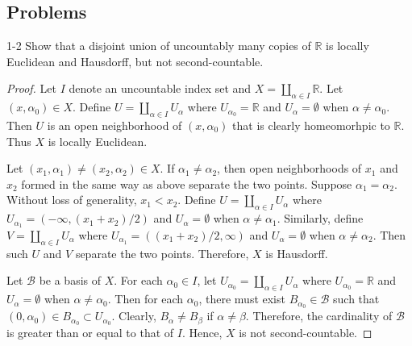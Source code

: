 \subsection{Problems}

\begin{customprob}{1-2}
  Show that a disjoint union of uncountably many copies of $\mathbb{R}$ is locally Euclidean and Hausdorff, but not second-countable.
\end{customprob}

\begin{proof}
  Let $I$ denote an uncountable index set and $X = \coprod_{\alpha \in I} \mathbb{R}$.
  Let $(x, \alpha_0) \in X$.
  Define $U = \coprod_{\alpha \in I} U_{\alpha}$ where $U_{\alpha_0} = \mathbb{R}$ and $U_{\alpha} = \emptyset$ when $\alpha \ne \alpha_0$.
  Then $U$ is an open neighborhood of $(x, \alpha_0)$ that is clearly homeomorhpic to $\mathbb{R}$.
  Thus $X$ is locally Euclidean.

  Let $(x_1, \alpha_1) \ne (x_2, \alpha_2) \in X$.
  If $\alpha_1 \ne \alpha_2$, then open neighborhoods of $x_1$ and $x_2$ formed in the same way as above separate the two points.
  Suppose $\alpha_1 = \alpha_2$.
  Without loss of generality, $x_1 < x_2$.
  Define $U = \coprod_{\alpha \in I} U_{\alpha}$ where $U_{\alpha_1} = (-\infty, (x_1 + x_2) / 2)$ and $U_{\alpha} = \emptyset$ when $\alpha \ne \alpha_1$.
  Similarly, define $V = \coprod_{\alpha \in I} U_{\alpha}$ where $U_{\alpha_1} = ((x_1 + x_2) / 2, \infty)$ and $U_{\alpha} = \emptyset$ when $\alpha \ne \alpha_2$.
  Then such $U$ and $V$ separate the two points.
  Therefore, $X$ is Hausdorff.

  Let $\mathcal{B}$ be a basis of $X$.
  For each $\alpha_0 \in I$, let $U_{\alpha_0} = \coprod_{\alpha \in I} U_{\alpha}$ where $U_{\alpha_0} = \mathbb{R}$ and $U_{\alpha} = \emptyset$ when $\alpha \ne \alpha_0$.
  Then for each $\alpha_0$, there must exist $B_{\alpha_0} \in \mathcal{B}$ such that $(0, \alpha_0) \in B_{\alpha_0} \subset U_{\alpha_0}$.
  Clearly, $B_{\alpha} \ne B_{\beta}$ if $\alpha \ne \beta$.
  Therefore, the cardinality of $\mathcal{B}$ is greater than or equal to that of $I$.
  Hence, $X$ is not second-countable.
\end{proof}
